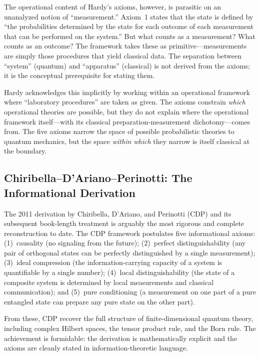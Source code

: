 \documentclass[pdflatex,sn-mathphys-num]{sn-jnl}%
\begin{document}
The operational content of Hardy's axioms, however, is parasitic on an unanalyzed notion of ``measurement.'' Axiom~1 states that the state is defined by ``the probabilities determined by the state for each outcome of each measurement that can be performed on the system.'' But what counts as a measurement? What counts as an outcome? The framework takes these as primitive---measurements are simply those procedures that yield classical data. The separation between ``system'' (quantum) and ``apparatus'' (classical) is not derived from the axioms; it is the conceptual prerequisite for stating them.

Hardy acknowledges this implicitly by working within an operational framework where ``laboratory procedures'' are taken as given. The axioms constrain \emph{which} operational theories are possible, but they do not explain where the operational framework itself---with its classical preparation-measurement dichotomy---comes from. The five axioms narrow the space of possible probabilistic theories to quantum mechanics, but the space \emph{within which} they narrow is itself classical at the boundary.

\subsection{Chiribella--D'Ariano--Perinotti: The Informational Derivation}

The 2011 derivation by Chiribella, D'Ariano, and Perinotti (CDP) \cite{Chiribella2011} and its subsequent book-length treatment \cite{DAriano2017} is arguably the most rigorous and complete reconstruction to date. The CDP framework postulates five informational axioms: (1)~causality (no signaling from the future); (2)~perfect distinguishability (any pair of orthogonal states can be perfectly distinguished by a single measurement); (3)~ideal compression (the information-carrying capacity of a system is quantifiable by a single number); (4)~local distinguishability (the state of a composite system is determined by local measurements and classical communication); and (5)~pure conditioning (a measurement on one part of a pure entangled state can prepare any pure state on the other part).

From these, CDP recover the full structure of finite-dimensional quantum theory, including complex Hilbert spaces, the tensor product rule, and the Born rule. The achievement is formidable: the derivation is mathematically explicit and the axioms are cleanly stated in information-theoretic language.
\end{document}
